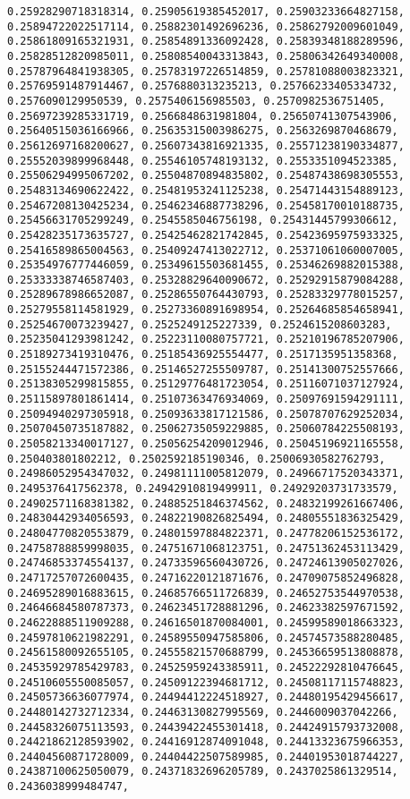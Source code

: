 \documentclass[11pt]{article}
\begin{document}
\begin{Verbatim}[commandchars=\\\{\}]
0.25928290718318314, 0.25905619385452017, 0.25903233664827158, 0.25894722022517114, 0.25882301492696236, 0.25862792009601049, 0.25861809165321931, 0.25854891336092428, 0.25839348188289596, 0.25828512820985011, 0.25808540043313843, 0.25806342649340008, 0.25787964841938305, 0.25783197226514859, 0.25781088003823321, 0.25769591487914467, 0.2576880313235213, 0.25766233405334732, 0.2576090129950539, 0.2575406156985503, 0.2570982536751405, 0.25697239285331719, 0.2566848631981804, 0.25650741307543906, 0.25640515036166966, 0.25635315003986275, 0.2563269870468679, 0.25612697168200627, 0.25607343816921335, 0.25571238190334877, 0.25552039899968448, 0.25546105748193132, 0.2553351094523385, 0.25506294995067202, 0.25504870894835802, 0.25487438698305553, 0.25483134690622422, 0.25481953241125238, 0.25471443154889123, 0.25467208130425234, 0.25462346887738296, 0.25458170010188735, 0.25456631705299249, 0.2545585046756198, 0.25431445799306612, 0.25428235173635727, 0.25425462821742845, 0.25423695975933325, 0.25416589865004563, 0.25409247413022712, 0.25371061060007005, 0.25354976777446059, 0.25349615503681455, 0.25346269882015388, 0.25333338746587403, 0.25328829640090672, 0.25292915879084288, 0.25289678986652087, 0.25286550764430793, 0.25283329778015257, 0.25279558114581929, 0.25273360891698954, 0.25264685854658941, 0.25254670073239427, 0.2525249125227339, 0.2524615208603283, 0.25235041293981242, 0.25223110080757721, 0.25210196785207906, 0.25189273419310476, 0.25185436925554477, 0.2517135951358368, 0.25155244471572386, 0.25146527255509787, 0.25141300752557666, 0.25138305299815855, 0.25129776481723054, 0.25116071037127924, 0.25115897801861414, 0.25107363476934069, 0.25097691594291111, 0.25094940297305918, 0.25093633817121586, 0.25078707629252034, 0.25070450735187882, 0.25062735059229885, 0.25060784225508193, 0.25058213340017127, 0.25056254209012946, 0.25045196921165558, 0.250403801802212, 0.2502592185190346, 0.25006930582762793, 0.24986052954347032, 0.24981111005812079, 0.24966717520343371, 0.2495376417562378, 0.24942910819499911, 0.24929203731733579, 0.24902571168381382, 0.24885251846374562, 0.24832199261667406, 0.24830442934056593, 0.24822190826825494, 0.24805551836325429, 0.24804770820553879, 0.24801597884822371, 0.24778206152536172, 0.24758788859998035, 0.24751671068123751, 0.24751362453113429, 0.24746853374554137, 0.24733596560430726, 0.24724613905027026, 0.24717257072600435, 0.24716220121871676, 0.24709075852496828, 0.24695289016883615, 0.24685766511726839, 0.24652753544970538, 0.24646684580787373, 0.24623451728881296, 0.24623382597671592, 0.24622888511909288, 0.24616501870084001, 0.24599589018663323, 0.24597810621982291, 0.24589550947585806, 0.24574573588280485, 0.24561580092655105, 0.24555821570688799, 0.24536659513808878, 0.24535929785429783, 0.24525959243385911, 0.24522292810476645, 0.24510605550085057, 0.24509122394681712, 0.24508117115748823, 0.24505736636077974, 0.24494412224518927, 0.24480195429456617, 0.24480142732712334, 0.24463130827995569, 0.2446009037042266, 0.24458326075113593, 0.24439422455301418, 0.24424915793732008, 0.24421862128593902, 0.24416912874091048, 0.24413323675966353, 0.24404560871728009, 0.24404422507589985, 0.24401953018744227, 0.24387100625050079, 0.24371832696205789, 0.2437025861329514, 0.2436038999484747, 
\end{Verbatim}
\end{document}
